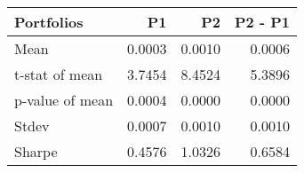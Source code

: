 \begin{tabular}{lrrr}
\toprule
Portfolios & P1 & P2 & P2 - P1 \\
\midrule
Mean & 0.0003 & 0.0010 & 0.0006 \\
t-stat of mean & 3.7454 & 8.4524 & 5.3896 \\
p-value of mean & 0.0004 & 0.0000 & 0.0000 \\
Stdev & 0.0007 & 0.0010 & 0.0010 \\
Sharpe & 0.4576 & 1.0326 & 0.6584 \\
\bottomrule
\end{tabular}

